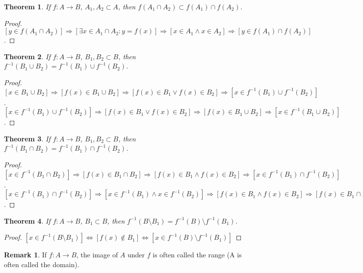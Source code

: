 \documentclass[oneside]{book}
\newtheorem{theorem}{Theorem}[section]
\theoremstyle{definition}
\newtheorem{remark}{Remark}[section]
\begin{document}
\begin{theorem}
If $f:A\rightarrow B$, $A_1,A_2\subset A$, then $f(A_1\cap A_2)\subset f(A_1)\cap f(A_2)$.
\end{theorem}
\begin{proof}
$[y\in f(A_1 \cap A_2)]\Rightarrow [\exists x\in A_1 \cap A_2:y=f(x)]\Rightarrow [x\in A_1 \land x \in A_2] \Rightarrow[y \in f(A_1)\cap f(A_2)]$.
\end{proof}

\begin{theorem}
If $f:A\rightarrow B$, $B_1,B_2\subset B$, then $f^{-1}(B_1\cup B_2) = f^{-1}(B_1)\cup f^{-1}(B_2)$.
\end{theorem}
\begin{proof}
$[x\in B_1\cup B_2]\Rightarrow [f(x)\in B_1\cup B_2]\Rightarrow [f(x)\in B_1\lor f(x)\in B_2]\Rightarrow [x\in f^{-1}(B_1)\cup f^{-1}(B_2)]$. $[x \in f^{-1}(B_1)\cup f^{-1}(B_2)]\Rightarrow [f(x)\in B_1\lor f(x) \in B_2]\Rightarrow [f(x) \in B_1\cup B_2]\Rightarrow [x\in f^{-1}(B_1\cup B_2)]$.
\end{proof}

\begin{theorem}
If $f:A\rightarrow B$, $B_1,B_2\subset B$, then $f^{-1}(B_1\cap B_2) = f^{-1}(B_1)\cap f^{-1}(B_2)$.
\end{theorem}
\begin{proof}
$[x\in f^{-1}(B_1\cap B_2)]\Rightarrow [f(x) \in B_1 \cap B_2]\Rightarrow [f(x)\in B_1\land f(x) \in B_2 ]\Rightarrow [x\in f^{-1}(B_1)\cap f^{-1}(B_2)]$. $[x\in f^{-1}(B_1)\cap f^{-1}(B_2)]\Rightarrow [x\in f^{-1}(B_1)\land x\in f^{-1}(B_2)]\Rightarrow [f(x) \in B_1\land f(x) \in B_2]\Rightarrow [f(x)\in B_1\cap B_2]\Rightarrow [x\in f^{-1}(B_1\cap B_2)]$.
\end{proof}

\begin{theorem}
If $f:A\rightarrow B$, $B_1 \subset B$, then $f^{-1}(B\setminus B_1) = f^{-1}(B)\setminus f^{-1}(B_1)$.
\end{theorem}
\begin{proof}
$[x\in f^{-1}(B\setminus B_1)]\Leftrightarrow [f(x)\notin B_1]\Leftrightarrow [x\in f^{-1}(B)\setminus f^{-1}(B_1)]$
\end{proof}

\begin{remark}
If $f:A\rightarrow B$, the image of $A$ under $f$ is often called the range (A is often called the domain).
\end{remark}
\end{document}
